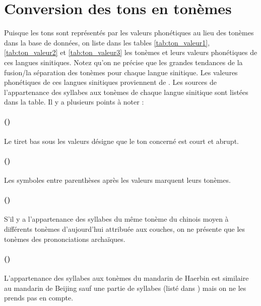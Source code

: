 \documentclass{scrbook}
\newcounter{c}[subsubsection]
\newcommand{\stpc}[1]{\stepcounter{#1}}
\begin{document}
\begin{sloppypar}
\section{Conversion des tons en tonèmes}\label{conv_toneme}
Puisque les tons sont représentés par les valeurs phonétiques au lieu des tonèmes dans la base de données, on liste dans les tables \ref{tab:ton_valeur1}, \ref{tab:ton_valeur2} et \ref{tab:ton_valeur3} les tonèmes et leurs valeurs phonétiques de ces langues sinitiques. Notez qu'on ne précise que les grandes tendances de la fusion/la séparation des tonèmes pour chaque langue sinitique. Les valeures phonétiques de ces langues sinitiques proviennent de \textcite[1--31]{Liu2007hexinci}. Les sources de l'appartenance des syllabes aux tonèmes de chaque langue sinitique sont listées dans la table. 
Il y a plusieurs points à noter :

\stpc{c}\paragraph{()}
Le tiret bas sous les valeurs désigne que le ton concerné est court et abrupt.

\stpc{c}\paragraph{()}
Les symboles entre parenthèses après les valeurs marquent leurs tonèmes.

\stpc{c}\paragraph{()}
S'il y a l'appartenance des syllabes du même tonème du chinois moyen à différents tonèmes d'aujourd'hui attribuée aux couches, on ne présente que les tonèmes des prononciations archaïques.

\stpc{c}\paragraph{()}
L'appartenance des syllabes aux tonèmes du mandarin de Haerbin est similaire au mandarin de Beijing sauf une partie de syllabes (listé dans \cite[13]{Yin1997Haerbin}) mais on ne les prends pas en compte.


\end{sloppypar}
\end{document}

